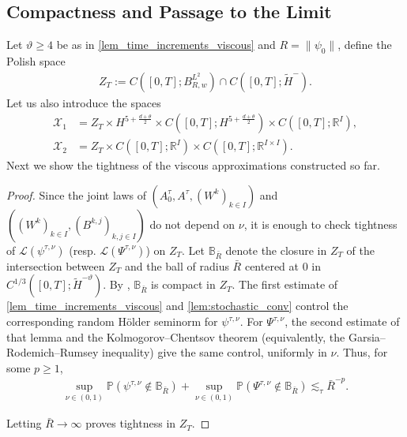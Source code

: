 \documentclass[a4paper,10pt]{amsart}
\newcommand{\R}{\mathbb{R}}
\newtheorem{lemma}[theorem]{Lemma}
\theoremstyle{remark}
\numberwithin{equation}{section}
\begin{document}
\subsection{Compactness and Passage to the Limit}
Let $\vartheta\geq 4$ be as in \cref{lem_time_increments_viscous} and $R=\|\psi_0\|$, define the Polish space
\begin{align*}
    Z_T:=
    C([0,T];B^{L^2}_{R,w})
    \cap C([0,T];\tilde{H}^-).
\end{align*}
Let us also introduce the spaces
\begin{align*}
    \mathcal{X}_1
    &=Z_T\times H^{5+\frac{d+\theta}{2}}
    \times C([0,T];H^{5+\frac{d+\theta}{2}})
    \times C([0,T];\R^I),\\
    \mathcal{X}_2
    &=Z_T\times C([0,T];\R^I)
    \times C([0,T];\R^{I\times I}).
\end{align*}
Next we show the tightness of the viscous approximations constructed so far.
\begin{proof}
    Since the joint laws of
    $(A^{\tau}_0,A^{\tau},(W^k)_{k\in I})$ and
    $((W^k)_{k\in I},(B^{k,j})_{k,j\in I})$ do not depend on $\nu$, it is
    enough to check tightness of $\mathscr{L}(\psi^{\tau,\nu})$ (resp.
    $\mathscr{L}(\Psi^{\tau,\nu})$) on $Z_T$.
    Let $\mathbb{B}_{\bar{R}}$ denote the closure in $Z_T$ of the intersection between $Z_T$ and the ball of radius ${\bar{R}}$ centered at $0$ in $C^{1/3}([0,T];\tilde{H}^{-\vartheta})$.
    By \cite[Lemma 2.2]{crippa2025zero},  $\mathbb B_{\bar{R}}$ is compact in
    $Z_T$.  The first estimate of
    \cref{lem_time_increments_viscous} and
    \cref{lem:stochastic_conv} control the corresponding random
    H\"older seminorm for $\psi^{\tau,\nu}$.  For
    $\Psi^{\tau,\nu}$, the second estimate of that lemma and the
    Kolmogorov--Chentsov theorem (equivalently, the
    Garsia--Rodemich--Rumsey inequality) give the same control, uniformly
    in $\nu$.  Thus, for some $p\geq1$,
    \begin{align*}
      \sup_{\nu\in(0,1)}
      \mathbb P(\psi^{\tau,\nu}\notin\mathbb B_{\bar{R}})
      +\sup_{\nu\in(0,1)}
      \mathbb P(\Psi^{\tau,\nu}\notin\mathbb B_{\bar{R}})
      \lesssim_{\tau} \bar{R}^{-p}.
    \end{align*} 
    
    Letting $\bar{R}\to\infty$ proves tightness in $Z_T$.
\end{proof}
\end{document}

